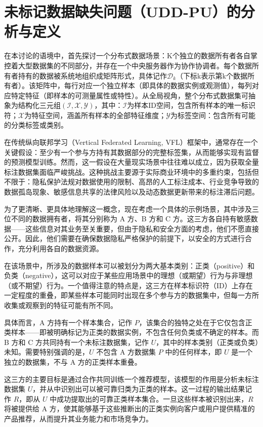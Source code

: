 \section{未标记数据缺失问题（UDD-PU）的分析与定义}
在本讨论的语境中，首先探讨一个分布式数据场景：K个独立的数据所有者各自掌控着大型数据集的不同部分，并存在一个中央服务器作为协作协调者。每个数据所有者持有的数据被系统地组织成矩阵形式，具体记作${{\mathsf{\mathcal{D}}}_{k}}$（下标k表示第k个数据所有者）。该矩阵中，每行对应一个独立样本（即具体的数据实例或观测值），每列对应特定特征（即样本的可测量属性或特性）。从全局视角，整个分布式数据集可抽象为结构化三元组$(\mathsf{\mathcal{I}}, \mathsf{\mathcal{X}}, \mathsf{\mathcal{Y}})$，其中：$\mathsf{\mathcal{I}}$为样本ID空间，包含所有样本的唯一标识符；$\mathsf{\mathcal{X}}$为特征空间，涵盖所有样本的全部特征维度；$\mathsf{\mathcal{Y}}$为标签空间：包含所有可能的分类标签或类别。

在传统纵向联邦学习（Vertical Federated Learning, VFL）框架中，通常存在一个关键假设：至少有一个参与方持有其数据部分的完整标签集，从而能够实现有监督的预测模型训练。然而，这一假设在大量现实场景中往往难以成立，因为获取全量标注数据集面临严峻挑战。这种挑战主要源于实际商业环境中的多重约束，包括但不限于：隐私保护法规对数据使用的限制、高昂的人工标注成本、行业竞争导致的数据孤岛现象、敏感信息共享的法律风险以及动态数据更新带来的标注滞后问题。

为了更清晰、更具体地理解这一概念，现在考虑一个具体的示例场景，其中涉及三位不同的数据拥有者，将其分别称为 A 方、B 方和 C 方。这三方各自持有敏感数据——这些信息对其业务至关重要，但由于隐私和安全方面的考虑，他们不愿直接公开。因此，他们需要在确保数据隐私严格保护的前提下，以安全的方式进行合作，充分利用各自的数据资源。

在该场景中，所涉及的数据样本可以被划分为两大基本类别：正类（positive）和负类（negative），这可以对应于某些应用场景中的理想（或期望）行为与非理想（或不期望）行为。一个值得注意的特点是，这三方在样本标识符（ID）上存在一定程度的重叠，即某些样本可能同时出现在多个参与方的数据集中，但每一方所收集或观察到的特征可能有所不同。

具体而言，A 方持有一个样本集合，记作 $ P $，该集合的独特之处在于它仅包含正类样本——即被明确标记为正类的数据实例，不包含任何负类或不确定的样本。而 B 方和 C 方共同持有一个未标注数据集，记作 $ U $，其中的样本类别（正类或负类）未知。需要特别强调的是，$ U $ 不包含 A 方数据集 $ P $ 中的任何样本，即 $ U $ 是一个独立的数据集，不与 A 方的正类样本重叠。

这三方的主要目标是通过合作共同训练一个推荐模型，该模型的作用是分析未标注数据集 $ U $，并从中识别出可以被可靠归类为正类的样本。这一过程的输出结果记作 $ R $，即从 $ U $ 中成功提取出的可靠正类样本集合。一旦这些样本被识别出来，$ R $ 将被提供给 A 方，使其能够基于这些推断出的正类实例向客户或用户提供精准的产品推荐，从而提升其业务能力和市场竞争力。


